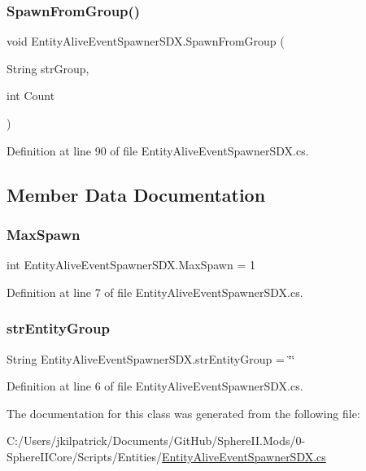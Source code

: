 \subsubsection{\texorpdfstring{SpawnFromGroup()}{SpawnFromGroup()}}
{\footnotesize\ttfamily void Entity\+Alive\+Event\+Spawner\+S\+D\+X.\+Spawn\+From\+Group (\begin{DoxyParamCaption}\item[{String}]{str\+Group,  }\item[{int}]{Count }\end{DoxyParamCaption})}



Definition at line 90 of file Entity\+Alive\+Event\+Spawner\+S\+D\+X.\+cs.



\subsection{Member Data Documentation}
\mbox{\label{class_entity_alive_event_spawner_s_d_x_ad51ed67c4e3d72c8d056f0a4ded3df1b}} 
\subsubsection{\texorpdfstring{MaxSpawn}{MaxSpawn}}
{\footnotesize\ttfamily int Entity\+Alive\+Event\+Spawner\+S\+D\+X.\+Max\+Spawn = 1}



Definition at line 7 of file Entity\+Alive\+Event\+Spawner\+S\+D\+X.\+cs.

\mbox{\label{class_entity_alive_event_spawner_s_d_x_aa0c5f7cbfca5d300657cb4b4a45c06bd}} 
\subsubsection{\texorpdfstring{strEntityGroup}{strEntityGroup}}
{\footnotesize\ttfamily String Entity\+Alive\+Event\+Spawner\+S\+D\+X.\+str\+Entity\+Group = \char`\"{}\char`\"{}}



Definition at line 6 of file Entity\+Alive\+Event\+Spawner\+S\+D\+X.\+cs.



The documentation for this class was generated from the following file\+:\begin{DoxyCompactItemize}
\item 
C\+:/\+Users/jkilpatrick/\+Documents/\+Git\+Hub/\+Sphere\+I\+I.\+Mods/0-\/\+Sphere\+I\+I\+Core/\+Scripts/\+Entities/\mbox{\hyperlink{_entity_alive_event_spawner_s_d_x_8cs}{Entity\+Alive\+Event\+Spawner\+S\+D\+X.\+cs}}\end{DoxyCompactItemize}
